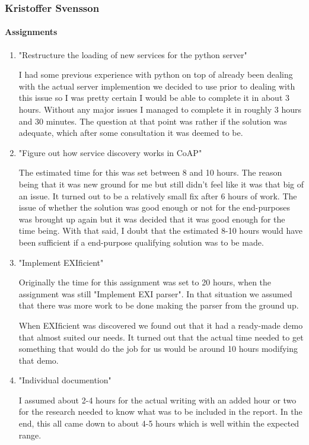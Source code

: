 \subsubsection{Kristoffer Svensson}
\paragraph{Assignments}
\begin{enumerate}
\item{"Restructure the loading of new services for the python server"}

I had some previous experience with python on top of already been dealing with the actual server implemention we decided to use prior to dealing with this issue so I was pretty certain I would be able to complete it in about 3 hours.
Without any major issues I managed to complete it in roughly 3 hours and 30 minutes. The question at that point was rather if the solution was adequate, which after some consultation it was deemed to be.

\item {"Figure out how service discovery works in CoAP"}

The estimated time for this was set between 8 and 10 hours. The reason being that it was new ground for me but still didn't feel like it was that big of
an issue. It turned out to be a relatively small fix after 6 hours of work. The issue of whether the solution was good enough or not for the end-purposes was brought up again but it was decided that it was good enough for the time being.
With that said, I doubt that the estimated 8-10 hours would have been sufficient if a end-purpose qualifying solution was to be made. 

\item {"Implement EXIficient"}

Originally the time for this assignment was set to 20 hours, when the assignment was still "Implement EXI parser". In that situation we assumed that there was more work to be done making the parser from the ground up.

When EXIficient was discovered we found out that it had a ready-made demo that almost suited our needs. It turned out that the actual time needed to get something that would do the job for us would be around 10 hours modifying that demo.

\item {"Individual documention"}

I assumed about 2-4 hours for the actual writing with an added hour or two for the research needed to know what was to be included in the report. In the end, this all came down to about 4-5 hours which is well within the expected range.

\end{enumerate}

